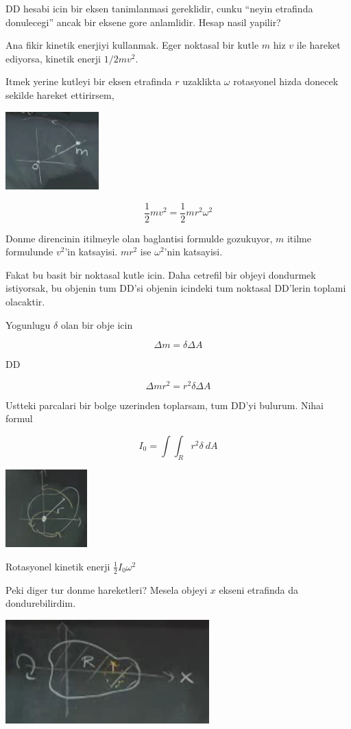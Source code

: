 \documentclass[12pt,fleqn]{article}\usepackage{../common}
\begin{document}
DD hesabi icin bir eksen tanimlanmasi gereklidir, cunku ``neyin etrafinda
donulecegi'' ancak bir eksene gore anlamlidir. Hesap nasil yapilir? 

Ana fikir kinetik enerjiyi kullanmak. Eger noktasal bir kutle $m$ hiz $v$
ile hareket ediyorsa, kinetik enerji $1/2 mv^2$. 

Itmek yerine kutleyi bir eksen etrafinda $r$ uzaklikta $\omega$ rotasyonel
hizda donecek sekilde hareket ettirirsem,

\includegraphics[height=3cm]{17_4.png}

\[ \frac{1}{2}mv^2 = \frac{1}{2}mr^2\omega^2  \]

Donme direncinin itilmeyle olan baglantisi formulde gozukuyor, $m$ itilme
formulunde $v^2$'in katsayisi. $mr^2$ ise $\omega^2$'nin katsayisi.

Fakat bu basit bir noktasal kutle icin. Daha cetrefil bir objeyi dondurmek
istiyorsak, bu objenin tum DD'si objenin icindeki tum noktasal DD'lerin
toplami olacaktir. 

Yogunlugu $\delta$ olan bir obje icin 

\[ \Delta m = \delta \Delta A \]

DD

\[ \Delta m r^2 = r^2 \delta \Delta A \]

Ustteki parcalari bir bolge uzerinden toplarsam, tum DD'yi bulurum. Nihai
formul

\[ I_0 = \int \int_R r^2 \delta \ dA \]

\includegraphics[height=3cm]{17_5.png}

Rotasyonel kinetik enerji $\frac{1}{2}I_0 \omega^2$

Peki diger tur donme hareketleri? Mesela objeyi $x$ ekseni etrafinda da
dondurebilirdim. 

\includegraphics[height=4cm]{17_6.png}
\end{document}
